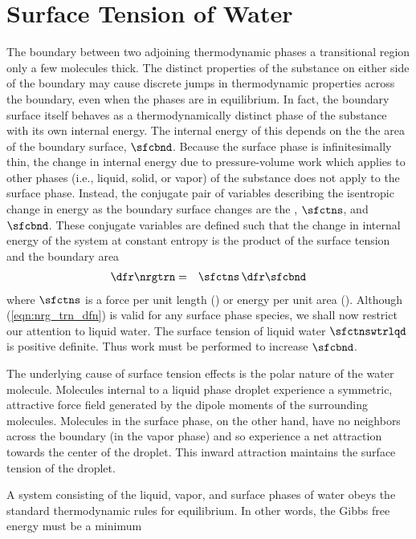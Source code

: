 \documentclass[12pt,twoside]{book}
\begin{document}
\section[Surface Tension of Water]{Surface Tension of Water}\label{sxn:tns_sfc}
The boundary between two adjoining thermodynamic phases a transitional
region only a few molecules thick.
The distinct properties of the substance on either side of the
boundary may cause discrete jumps in thermodynamic properties across
the boundary, even when the phases are in equilibrium.
In fact, the boundary surface itself behaves as a thermodynamically
distinct phase of the substance with its own internal energy.
The internal energy of this  depends on the 
the area of the boundary surface, $\sfcbnd$.
Because the surface phase is infinitesimally thin, the change in
internal energy due to pressure-volume work which applies to other
phases (i.e., liquid, solid, or vapor) of the substance does not apply
to the surface phase.
Instead, the conjugate pair of variables describing the isentropic
change in energy as the boundary surface changes are the
, $\sfctns$, and $\sfcbnd$.
These conjugate variables are defined such that the change in internal
energy of the system at constant entropy is the product of the surface
tension and the boundary area
\begin{eqnarray}
\dfr\nrgtrn & = & \sfctns \,\dfr\sfcbnd
\label{eqn:nrg_trn_dfn}
\end{eqnarray}
where $\sfctns$ is a force per unit length (\pxm) or energy per unit
area (\jxmS).
Although (\ref{eqn:nrg_trn_dfn}) is valid for any surface phase
species, we shall now restrict our attention to liquid water.
The surface tension of liquid water $\sfctnswtrlqd$ is positive
definite. 
Thus work must be performed to increase $\sfcbnd$.

The underlying cause of surface tension effects is the polar nature of
the water molecule.
Molecules internal to a liquid phase droplet experience a symmetric,
attractive force field generated by the dipole moments of the
surrounding molecules.
Molecules in the surface phase, on the other hand, have no neighbors
across the boundary (in the vapor phase) and so experience a net
attraction towards the center of the droplet. 
This inward attraction maintains the surface tension of the droplet.

A system consisting of the liquid, vapor, and surface phases of water
obeys the standard thermodynamic rules for equilibrium.
In other words, the Gibbs free energy must be a minimum
\end{document}
